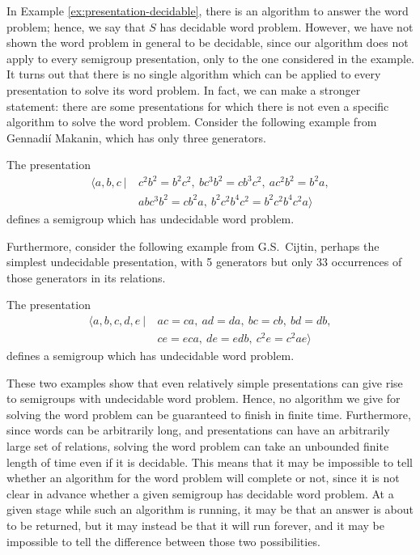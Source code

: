 In Example \ref{ex:presentation-decidable}, there is an algorithm to answer the
word problem; hence, we
say that $S$ has decidable word problem.  However, we have not shown the word
problem in general to be decidable, since our algorithm does not apply to every
semigroup presentation, only to the one considered in the example.  It turns out
that there is no single algorithm which can be applied to every presentation to
solve its word problem.  In fact, we can make a stronger statement: there are
some presentations for which there is not even a specific algorithm to solve
the word problem.  Consider the
following example from Gennadi\'{i} Makanin, which has only three generators.

\begin{example}[Makanin, 1966]
  \label{ex:makanin}
  The presentation
  \begin{align*}
    \langle a,b,c ~|~ & c^2b^2 = b^2c^2,\ bc^3b^2 = cb^3c^2,\ ac^2b^2 = b^2a,\\
                      & abc^3b^2 = cb^2a,\ b^2c^2b^4c^2 = b^2c^2b^4c^2a \rangle
  \end{align*}
  defines a semigroup which has undecidable word problem.  \cite{makanin_1966}
\end{example}

Furthermore, consider the following example from G.S.~Cijtin, perhaps the
simplest undecidable presentation, with 5 generators but only 33 occurrences of
those generators in its relations.

\begin{example}[Cijtin, 1957]
  \label{ex:cijtin}
  The presentation
  \begin{align*}
    \langle a,b,c,d,e ~|~ & ac=ca,\ ad=da,\ bc=cb,\ bd=db,\\
                          & ce=eca,\ de=edb,\ c^2e=c^2ae \rangle
  \end{align*}
  defines a semigroup which has undecidable word problem.
  \cite{cijtin_1957, collins_1986}
\end{example}

These two examples show that even relatively simple presentations can give rise
to semigroups with undecidable word problem.  Hence, no algorithm we give for
solving the word problem can be guaranteed to finish in finite time.
Furthermore, since words can be arbitrarily long, and presentations can have an
arbitrarily large set of relations, solving the word problem can take an
unbounded finite length of time even if it is decidable.  This means that it may
be impossible to tell whether an algorithm for the word problem will complete or
not, since it is not clear in advance whether a given semigroup has decidable
word problem.  At a given stage while such an algorithm is running, it may be
that an answer is about to be returned, but it may instead be that it will run
forever, and it may be impossible to tell the difference between those two
possibilities.

